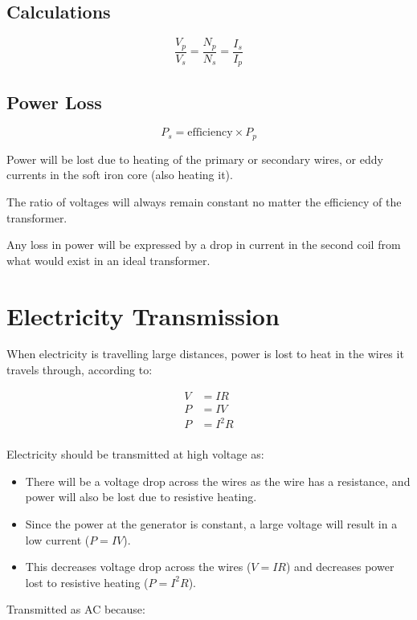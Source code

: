 \documentclass[a4paper,11pt]{article}
\begin{document}
\subsection{Calculations}

$$
\frac{V_p}{V_s} = \frac{N_p}{N_s} = \frac{I_s}{I_p}
$$


\subsection{Power Loss}

$$
P_s = \mbox{efficiency} \times P_p
$$

Power will be lost due to heating of the primary or secondary wires, or eddy
currents in the soft iron core (also heating it).

The ratio of voltages will always remain constant no matter the efficiency of
the transformer.

Any loss in power will be expressed by a drop in current in the second coil
from what would exist in an ideal transformer.




\section{Electricity Transmission}

When electricity is travelling large distances, power is lost to heat in the
wires it travels through, according to:

$$
\begin{aligned}
V & = IR \\
P & = IV \\
P & = I^2 R \\
\end{aligned}
$$

Electricity should be transmitted at high voltage as:

\begin{itemize}
\item There will be a voltage drop across the wires as the wire has a
	resistance, and power will also be lost due to resistive heating.
\item Since the power at the generator is constant, a large voltage will
	result in a low current ($P = IV$).
\item This decreases voltage drop across the wires ($V = IR$) and decreases
	power lost to resistive heating ($P = I^2R$).
\end{itemize}

Transmitted as AC because:
\end{document}
